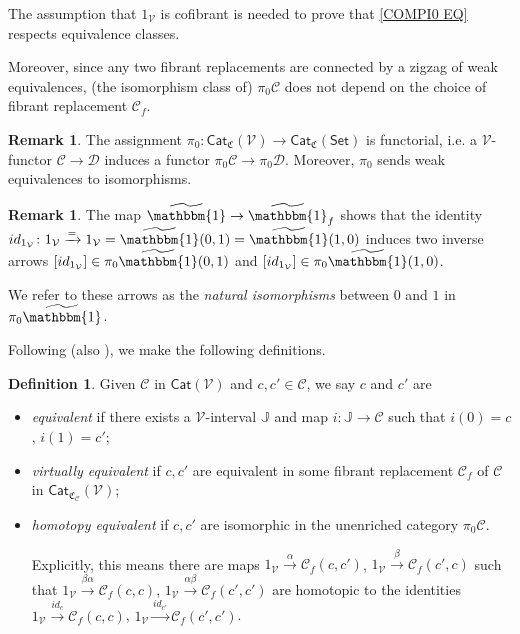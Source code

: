 \documentclass[a4paper,10pt
 ,final
]{article}%
\numberwithin{equation}{section}
\numberwithin{figure}{section}
\theoremstyle{definition} %
\newtheorem{definition}[equation]{Definition}%
\newtheorem{remark}[equation]{Remark}%
\newcommand{\Cat}{\mathsf{Cat}}
\newcommand{\V}{\ensuremath{\mathcal V}}
\newcommand{\1}{\ensuremath{\mathbbm 1}}%
\begin{document}
The assumption that $1_{\mathcal{V}}$ is cofibrant
is needed to prove that \eqref{COMPI0 EQ}
respects equivalence classes. 

Moreover, since any two fibrant replacements are connected by a zigzag of weak equivalences,
(the isomorphism class of) $\pi_0 \mathcal{C}$ does not depend on the choice of fibrant replacement $\mathcal{C}_f$.



\begin{remark}
      The assignment
      $\pi_0\colon \mathsf{Cat}_{\mathfrak{C}}(\V)
\to \mathsf{Cat}_{\mathfrak{C}}(\mathsf{Set})$ is functorial,
i.e. a $\V$-functor
$\mathcal{C} \to \mathcal{D}$
induces a functor 
$\pi_0\mathcal{C} \to \pi_0\mathcal{D}$.
Moreover, $\pi_0$ sends weak equivalences to isomorphisms.
\end{remark}



\begin{remark}\label{NATISO REM}
The map $\widetilde{\mathbbm{1}} \to \widetilde{\mathbbm{1}}_f$
shows that the identity
$id_{1_{\V}}\colon 1_{\V} \xrightarrow{=} 1_{\V} = \widetilde{\mathbbm{1}}(0,1) = \widetilde{\mathbbm{1}}(1,0)$
induces two inverse arrows
$[id_{1_{\V}}] \in \pi_0 \widetilde{\mathbbm{1}}(0,1)$
and
$[id_{1_{\V}}] \in \pi_0 \widetilde{\mathbbm{1}}(1,0)$.

We refer to these arrows as the
\emph{natural isomorphisms} between $0$ and $1$ in $\pi_0 \widetilde{\mathbbm{1}}$.
\end{remark}




Following \cite[Def. 2.6]{BM13} (also \cite{Cav}),
we make the following definitions.

\begin{definition}\label{EQUIV_DEF}
	Given $\mathcal{C}$ in  $\Cat(\V)$ and $c,c'\in \mathcal C$, we say $c$ and $c'$ are
\begin{itemize}
	\item {\em equivalent} if there exists a $\V$-interval $\mathbb{J}$
	and map $i: \mathbb{J} \to \mathcal C$ such that
	$i(0)= c$, $i(1)= c'$;
	\item {\em virtually equivalent} if $c,c'$ are equivalent in some fibrant replacement
	$\mathcal C_f$ of $\mathcal C$ in $\Cat_{\mathfrak{C}_{\mathcal{C}}}(\V)$;
	\item {\em homotopy equivalent} if $c,c'$ are isomorphic in the unenriched category $\pi_0 \mathcal C$.

	Explicitly, this means there are maps 
	$1_\V \xrightarrow{\alpha} \mathcal C_f(c,c')$, 
	$1_\V \xrightarrow{\beta} \mathcal C_f(c',c)$ such that
	$1_{\V} \xrightarrow{\beta \alpha} \mathcal C_f(c,c)$,
	$1_{\V} \xrightarrow{\alpha \beta} \mathcal C_f(c',c')$
	are homotopic to the identities
	$1_{\V} \xrightarrow{id_c} \mathcal C_f(c,c)$,
	$1_{\V} \xrightarrow{id_{c'}} \mathcal C_f(c',c')$.
\end{itemize}
\end{definition}
\end{document}
